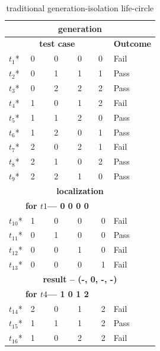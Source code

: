 \documentclass{sig-alternate}
\begin{document}
\begin{table}[h]
\caption{traditional generation-isolation life-circle}
\label{tradition-gi}
\center
\begin{tabular}{llllll}
\hline
\multicolumn{6}{c}{\bfseries generation} \\
\hline
\multicolumn{5}{c}{\bfseries test case} & \bfseries Outcome \\
 $t_{1}$* & \multicolumn{4}{l}{0 \ \ \ \ 0 \ \ \ \  0\ \ \ \ 0} & Fail \\
 $t_{2}$* & \multicolumn{4}{l}{0 \ \ \ \ 1 \ \ \ \  1\ \ \ \ 1} & Pass \\
 $t_{3}$* & \multicolumn{4}{l}{0 \ \ \ \ 2 \ \ \ \  2\ \ \ \ 2} & Pass \\
 $t_{4}$* & \multicolumn{4}{l}{1 \ \ \ \ 0 \ \ \ \  1\ \ \ \ 2} & Fail \\
 $t_{5}$* & \multicolumn{4}{l}{1 \ \ \ \ 1 \ \ \ \  2\ \ \ \ 0} & Pass \\
 $t_{6}$* & \multicolumn{4}{l}{1 \ \ \ \ 2 \ \ \ \  0\ \ \ \ 1} & Pass \\
 $t_{7}$* & \multicolumn{4}{l}{2 \ \ \ \ 0 \ \ \ \  2\ \ \ \ 1} & Fail \\
 $t_{8}$* & \multicolumn{4}{l}{2 \ \ \ \ 1 \ \ \ \  0\ \ \ \ 2} & Pass \\
 $t_{9}$* & \multicolumn{4}{l}{2 \ \ \ \ 2 \ \ \ \  1\ \ \ \ 0} & Pass \\
 \hline
\multicolumn{6}{c}{\bfseries localization}  \\
\hline
\multicolumn{5}{c}{\bfseries for $t1$--- 0 0 0 0} &  \\
$t_{10}$* &\multicolumn{4}{l}{1  \ \ \ \  0 \ \ \ \  0 \ \ \ \  0} & Fail \\
$t_{11}$* &\multicolumn{4}{l}{0  \ \ \ \  1 \ \ \ \  0 \ \ \ \  0} & Pass \\
$t_{12}$* &\multicolumn{4}{l}{0  \ \ \ \  0 \ \ \ \  1  \ \ \ \ 0} & Fail \\
$t_{13}$* &\multicolumn{4}{l}{0  \ \ \ \  0 \ \ \ \  0  \ \ \ \ 1} & Fail \\
\multicolumn{6}{c}{\bfseries result --  (-, 0, -, -)}  \\
\multicolumn{5}{c}{\bfseries for $t4$--- 1 0 1 2} &  \\
$t_{14}$* &\multicolumn{4}{l}{2  \ \ \ \  0 \ \ \ \  1 \ \ \ \  2} & Fail \\
$t_{15}$* &\multicolumn{4}{l}{1  \ \ \ \  1 \ \ \ \  1 \ \ \ \  2} & Pass \\
$t_{16}$* &\multicolumn{4}{l}{1  \ \ \ \  0 \ \ \ \  2  \ \ \ \ 2} & Fail \\

\end{tabular}
\end{table}
\end{document}
